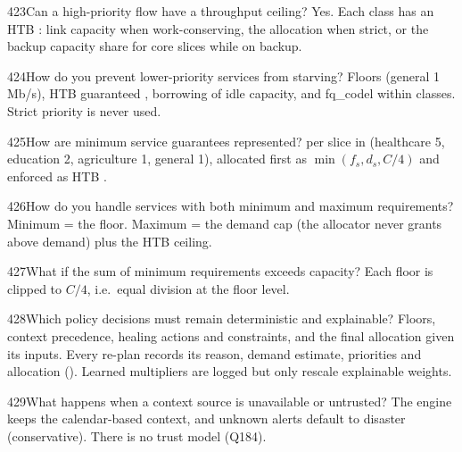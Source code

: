 \begin{qa}{423}{Can a high-priority flow have a throughput ceiling?}
Yes. Each class has an HTB : link capacity when work-conserving, the allocation when strict, or the backup
capacity share for core slices while on backup.
\end{qa}

\begin{qa}{424}{How do you prevent lower-priority services from starving?}
Floors (general 1\,Mb/s), HTB guaranteed , borrowing of idle capacity, and fq\_codel within classes. Strict
priority is never used.
\end{qa}

\begin{qa}{425}{How are minimum service guarantees represented?}
 per slice in  (healthcare 5, education 2, agriculture 1, general 1), allocated first
as $\min(f_s,d_s,C/4)$ and enforced as HTB .
\end{qa}

\begin{qa}{426}{How do you handle services with both minimum and maximum requirements?}
Minimum = the floor. Maximum = the demand cap (the allocator never grants above demand) plus the HTB ceiling.
\end{qa}

\begin{qa}{427}{What if the sum of minimum requirements exceeds capacity?}
Each floor is clipped to $C/4$, i.e.\ equal division at the floor level.
\end{qa}

\begin{qa}{428}{Which policy decisions must remain deterministic and explainable?}
Floors, context precedence, healing actions and constraints, and the final allocation given its inputs. Every
re-plan records its reason, demand estimate, priorities and allocation (). Learned
multipliers are logged but only rescale explainable weights.
\end{qa}

\begin{qa}{429}{What happens when a context source is unavailable or untrusted?}
The engine keeps the calendar-based context, and unknown alerts default to disaster (conservative). There is no trust
model (Q184).
\end{qa}

